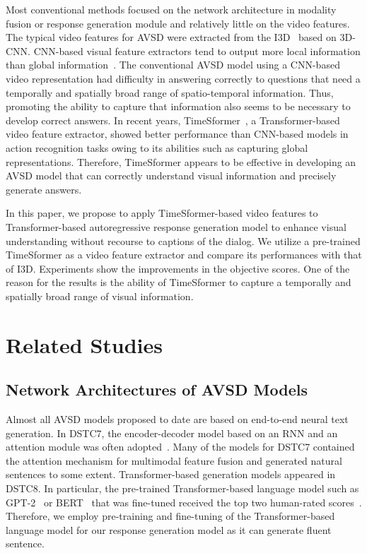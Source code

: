 \documentclass[letterpaper]{article}
\begin{document}
Most conventional methods focused on the network architecture in modality fusion or response generation module and relatively little on the video features.
The typical video features for AVSD were extracted from the I3D~\cite{Carreira2017quo} based on 3D-CNN.
CNN-based visual feature extractors tend to output more local information than global information~\cite{Raghu2021vision}.
The conventional AVSD model using a CNN-based video representation had difficulty in answering correctly to questions that need a temporally and spatially broad range of spatio-temporal information.
Thus, promoting the ability to capture that information also seems to be necessary to develop correct answers.
In recent years, TimeSformer~\cite{Bertasius2021is}, a Transformer-based video feature extractor, showed better performance than CNN-based models in action recognition tasks owing to its abilities such as capturing global representations.
Therefore, TimeSformer appears to be effective in developing an AVSD model that can correctly understand visual information and precisely generate answers.

In this paper, we propose to apply TimeSformer-based video features to Transformer-based autoregressive response generation model to enhance visual understanding without recourse to captions of the dialog.
We utilize a pre-trained TimeSformer as a video feature extractor and compare its performances with that of I3D.
Experiments show the improvements in the objective scores.
One of the reason for the results is the ability of TimeSformer to capture a temporally and spatially broad range of visual information.



\section{Related Studies}

\subsection{Network Architectures of AVSD Models}
Almost all AVSD models proposed to date are based on end-to-end neural text generation.
In DSTC7, the encoder-decoder model based on an RNN and an attention module was often adopted~\cite{Nguyen2018from,Hori2019end}.
Many of the models for DSTC7 contained the attention mechanism for multimodal feature fusion and generated natural sentences to some extent.
Transformer-based generation models appeared in DSTC8.
In particular, the pre-trained Transformer-based language model such as GPT-2~\cite{Radford2019language} or BERT~\cite{Devlin2018bert} that was fine-tuned received the top two human-rated scores~\cite{Li2021bridging,Chen2020pretraining}.
Therefore, we employ pre-training and fine-tuning of the Transformer-based language model for our response generation model as it can generate fluent sentence.
\end{document}
